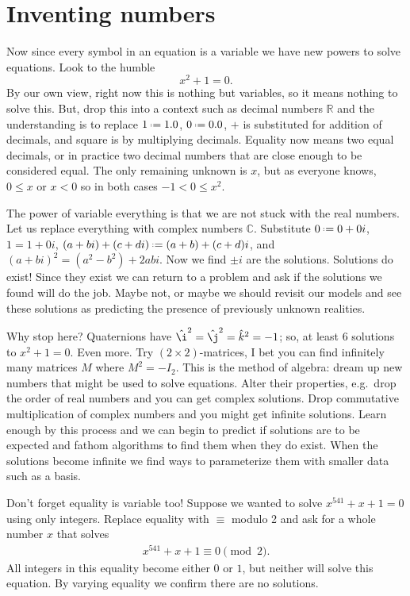 \section{Inventing numbers}
Now since every symbol in an equation is a variable we have new powers 
to solve equations.  Look to the humble 
\[
    x^2+1=0.
\]
By our own view, right now this is nothing but variables, so it means nothing to
solve this.  But, drop this into a context such as decimal numbers $\mathbb{R}$
and the understanding is to replace $1\defeq 1.0$, $0\defeq 0.0$, $+$ is
substituted for addition of decimals, and square is by multiplying decimals.
Equality now means two equal decimals, or in practice two decimal numbers that are close enough 
to be considered equal.  The only remaining unknown is $x$, but as everyone 
knows, $0\leq x$ or $x<0$ so in both cases $-1<0\leq x^2$.

The power of variable everything is that we are not stuck with the real numbers.
Let us replace everything with complex numbers $\mathbb{C}$. Substitute $0\defeq
0+0i$, $1=1+0i$, $(a+bi)+(c+di)\defeq (a+b)+(c+d)i$, and
$(a+bi)^2=(a^2-b^2)+2abi$.  Now we find $\pm i$ are the solutions. Solutions do
exist!  Since they exist we can return to a problem and ask if the solutions we 
found will do the job.  Maybe not, or maybe we should revisit our models and 
see these solutions as predicting the presence of previously unknown realities.

Why stop here? Quaternions have $\hat{\i}^2=\hat{\j}^2=\hat{k}^2=-1$;
so, at least 6 solutions to $x^2+1=0$.  Even more.  Try $(2\times 2)$-matrices, I
bet you can find infinitely many matrices $M$ where $M^2=-I_2$.  This is the method
of algebra: dream up new numbers that might be used to solve equations.  Alter
their properties, e.g.\ drop the order of real numbers and you can get complex
solutions.  Drop commutative multiplication of complex numbers and you might get
infinite solutions.  Learn enough by this process and we can begin to predict if
solutions are to be expected and fathom algorithms to find them when they do
exist. When the solutions become infinite we find ways to parameterize them with
smaller data such as a basis.

Don't forget equality is variable too!  Suppose we wanted to solve $x^{541}+x+1=0$
using only integers.  Replace equality 
with $\equiv$ modulo 2 and ask for a whole number $x$ that solves
\begin{align*}
    x^{541}+x+1\equiv 0\pmod{2}.
\end{align*}
All integers in this equality become either $0$ or $1$, but neither will solve 
this equation.  By varying equality we confirm there are no solutions.

